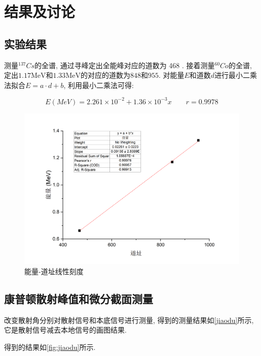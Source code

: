 \documentclass[font=default]{mpltx}
\begin{document}
\section{结果及讨论}

  \subsection{实验结果}

    测量${^{137}Cs}$的全谱, 通过寻峰定出全能峰对应的道数为 468 . 接着测量${^{60}Co}$的全谱, 定出$1.17\text{MeV}$和$1.33\text{MeV}$的对应的道数为$848$和$955$.
    对能量$E$和道数$d$进行最小二乘法拟合$E = a \cdot d + b $, 
    利用最小二乘法可得: 

	  \begin{equation}
		  E(MeV)=2.261 \times 10^{-2}+1.36 \times 10^{-3} x\qquad r=0.9978
	  \end{equation}

    \begin{figure}[htbp]
      \centering
      \includegraphics[width=0.85\linewidth]{fig/nihe.png}
      \caption{能量-道址线性刻度}
      \label{fig:nihe}
    \end{figure}

    \subsection{康普顿散射峰值和微分截面测量}

    改变散射角分别对散射信号和本底信号进行测量,  得到的测量结果如\autoref{jiaodu}所示, 它是散射信号减去本地信号的画图结果. 
    
    得到的结果如\autoref{fig:jiaodu}所示.
\end{document}
